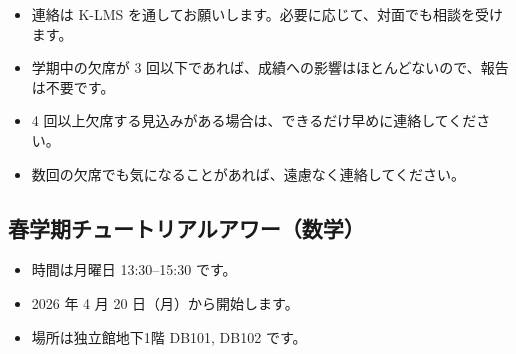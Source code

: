 \documentclass[a4paper,12pt]{jsarticle}
\begin{document}
\begin{itemize}[leftmargin=2em]
\item 連絡は K-LMS を通してお願いします。必要に応じて、対面でも相談を受けます。
\item 学期中の欠席が 3 回以下であれば、成績への影響はほとんどないので、報告は不要です。
\item 4 回以上欠席する見込みがある場合は、できるだけ早めに連絡してください。
\item 数回の欠席でも気になることがあれば、遠慮なく連絡してください。
\end{itemize}

\subsection*{春学期チュートリアルアワー（数学）}

\begin{itemize}[leftmargin=2em]
\item 時間は月曜日 13:30--15:30 です。
\item 2026 年 4 月 20 日（月）から開始します。
\item 場所は独立館地下1階 DB101, DB102 です。
\end{itemize}
\end{document}

